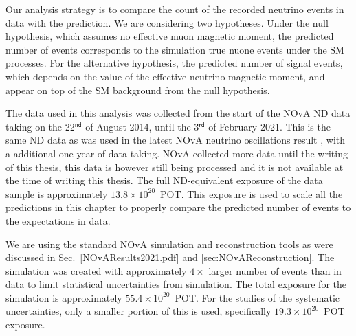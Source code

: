 Our analysis strategy is to compare the count of the recorded neutrino events in data with the prediction. We are considering two hypotheses. Under the null hypothesis, which assumes no effective muon magnetic moment, the predicted number of events corresponds to the simulation true \gls{nuone} events under the \gls{SM} processes. For the alternative hypothesis, the predicted number of signal events, which depends on the value of the effective neutrino magnetic moment, and appear on top of the \gls{SM} background from the null hypothesis.



The data used in this analysis was collected from the start of the \gls{NOvA} \gls{ND} data taking on the 22$^{\textsf{nd}}$ of August 2014, until the 3$^{\textsf{rd}}$ of February 2021. This is the same \gls{ND} data as was used in the latest \gls{NOvA} neutrino oscillations result \cite{NOvAResults2021.pdf}, with a additional one year of data taking. \gls{NOvA} collected more data until the writing of this thesis, this data is however still being processed and it is not available at the time of writing this thesis. The full \gls{ND}-equivalent exposure of the data sample is approximately $13.8\times10^{20}$~\gls{POT}. This exposure is used to scale all the predictions in this chapter to properly compare the predicted number of events to the expectations in data.

We are using the standard \gls{NOvA} simulation and reconstruction tools as were discussed in Sec.~\ref{NOvAResults2021.pdf} and \ref{sec:NOvAReconstruction}. The simulation was created with approximately $4\times$ larger number of events than in data to limit statistical uncertainties from simulation. The total exposure for the simulation is approximately $55.4\times10^{20}$~\gls{POT}. For the studies of the systematic uncertainties, only a smaller portion of this is used, specifically $19.3\times10^{20}$~\gls{POT} exposure.

